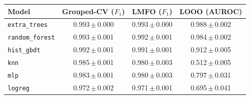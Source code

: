 \begin{tabular}{lccc}
\toprule
Model & Grouped-CV ($F_1$) & LMFO ($F_1$) & LOOO (AUROC) \\
\midrule
\texttt{extra\_trees} & 0.993\,$\pm$\,0.000 & 0.993\,$\pm$\,0.000 & 0.988\,$\pm$\,0.002 \\
\texttt{random\_forest} & 0.993\,$\pm$\,0.001 & 0.992\,$\pm$\,0.001 & 0.984\,$\pm$\,0.002 \\
\texttt{hist\_gbdt} & 0.992\,$\pm$\,0.001 & 0.991\,$\pm$\,0.001 & 0.912\,$\pm$\,0.005 \\
\texttt{knn} & 0.985\,$\pm$\,0.001 & 0.980\,$\pm$\,0.003 & 0.512\,$\pm$\,0.005 \\
\texttt{mlp} & 0.983\,$\pm$\,0.001 & 0.980\,$\pm$\,0.003 & 0.797\,$\pm$\,0.031 \\
\texttt{logreg} & 0.972\,$\pm$\,0.002 & 0.971\,$\pm$\,0.001 & 0.695\,$\pm$\,0.041 \\
\bottomrule
\end{tabular}